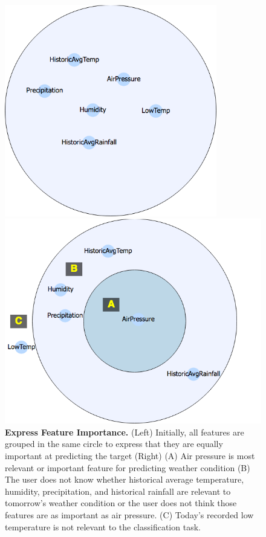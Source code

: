 \begin{figure}
    \centering
    \begin{minipage}{0.5\textwidth}
        \centering
        \includegraphics[width=0.825\textwidth]{FeatureImportance1}
    \end{minipage}\hfill
    \begin{minipage}{0.5\textwidth}
        \centering
        \includegraphics[width=1\textwidth]{FeatureImportance2Labeled}
    \end{minipage}
    \caption{\textbf{Express Feature Importance.} (Left) Initially, all features are grouped in the same circle to express that they are equally important at predicting the target (Right) (A) Air pressure is most relevant or important feature for predicting weather condition (B) The user does not know whether historical average temperature, humidity, precipitation, and historical rainfall are relevant to tomorrow's weather condition or the user does not think those features are as important as air pressure. (C) Today's recorded low temperature is not relevant to the classification task.}
    \label{fig:ExpressFeatureImportance}
\end{figure}

